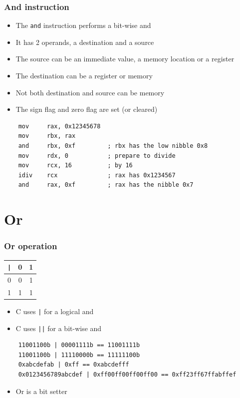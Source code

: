 \documentclass{beamer}
\begin{document}
\begin{frame}[fragile]
    \frametitle{And instruction}
    \begin{itemize}
        \item The {\tt and} instruction performs a bit-wise and
        \item It has 2 operands, a destination and a source
        \item The source can be an immediate value, a memory location
              or a register
        \item The destination can be a register or memory
        \item Not both destination and source can be memory
        \item The sign flag and zero flag are set (or cleared)
    \end{itemize}

\begin{verbatim}
    mov     rax, 0x12345678
    mov     rbx, rax
    and     rbx, 0xf         ; rbx has the low nibble 0x8
    mov     rdx, 0           ; prepare to divide
    mov     rcx, 16          ; by 16
    idiv    rcx              ; rax has 0x1234567
    and     rax, 0xf         ; rax has the nibble 0x7
\end{verbatim}
\end{frame}

\section{Or}

\begin{frame}[fragile]
    \frametitle{Or operation}
\begin{center}
\begin{tabular}{c|cc}
{\tt |} & 0 & 1 \\
\hline
0       & 0 & 1 \\
1       & 1 & 1 \\
\end{tabular}
\end{center}
    \begin{itemize}
        \item C uses {\tt |} for a logical and
        \item C uses {\tt ||} for a bit-wise and
    \end{itemize}
\small
\begin{verbatim}
    11001100b | 00001111b == 11001111b
    11001100b | 11110000b == 11111100b
    0xabcdefab | 0xff == 0xabcdefff
    0x0123456789abcdef | 0xff00ff00ff00ff00 == 0xff23ff67ffabffef
\end{verbatim}
    \begin{itemize}
        \item Or is a bit setter
    \end{itemize}
\end{frame}
\end{document}

